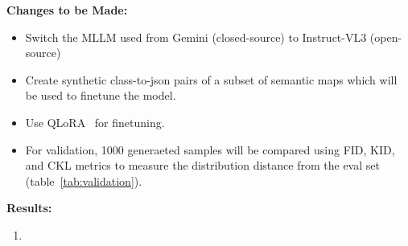 \documentclass{article}
\begin{document}
\textbf{Changes to be Made:}
\begin{itemize}
    \item Switch the MLLM used from Gemini (closed-source) to Instruct-VL3 (open-source)
    \item Create synthetic class-to-json pairs of a subset of semantic maps which will be used to finetune the model.
    \item Use QLoRA~\cite{dettmers2023qlora} for finetuning.
    \item For validation, 1000 generaeted samples will be compared using FID, KID, and CKL metrics to measure the distribution distance from the eval set (table~\ref{tab:validation}).
\end{itemize}

\textbf{Results:}
\begin{enumerate}
    \item 
\end{enumerate}
\end{document}

